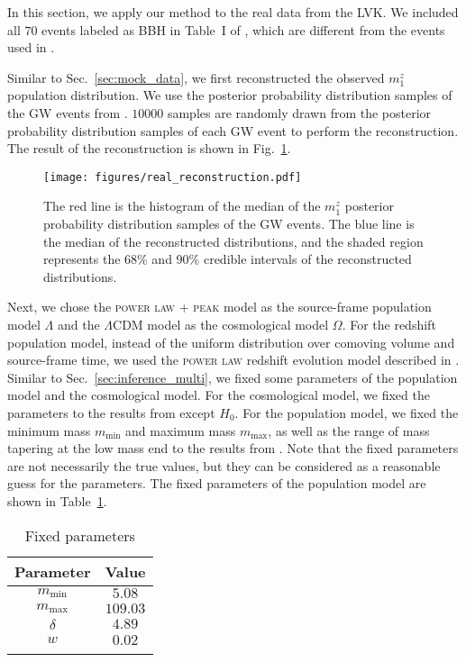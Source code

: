 \documentclass[sn-aps, pdflatex]{sn-jnl}
\begin{document}
In this section, we apply our method to the real data from the \ac{LVK}.
We included all $70$ events labeled as BBH in Table~I of \cite{KAGRA:2021duu}, which are different from the events used in \cite{LIGOScientific:2021aug}.

Similar to Sec.~\ref{sec:mock_data}, we first reconstructed the observed $m^z_1$ population distribution.
We use the posterior probability distribution samples of the \ac{GW} events from \cite{LIGOScientific:2019lzm, KAGRA:2023pio}.
$10000$ samples are randomly drawn from the posterior probability distribution samples of each \ac{GW} event to perform the reconstruction.
The result of the reconstruction is shown in Fig.~\ref{fig:real_reconstruction}.
\begin{figure}[htbp]
    \texttt{[image: figures/real\_reconstruction.pdf]}
    \caption{
        The red line is the histogram of the median of the $m^z_1$ posterior probability distribution samples of the \ac{GW} events.
        The blue line is the median of the reconstructed distributions, and the shaded region represents the 68\% and 90\% credible intervals of the reconstructed distributions.
    }
    \label{fig:real_reconstruction}
\end{figure}

Next, we chose the \textsc{power law + peak} model as the source-frame population model $\Lambda$ and the $\Lambda$CDM model as the cosmological model $\Omega$.
For the redshift population model, instead of the uniform distribution over comoving volume and source-frame time, we used the \textsc{power law} redshift evolution model described in \cite{KAGRA:2021duu}.
Similar to Sec.~\ref{sec:inference_multi}, we fixed some parameters of the population model and the cosmological model.
For the cosmological model, we fixed the parameters to the results from \cite{Planck:2018vyg} except $H_0$.
For the population model, we fixed the minimum mass $m_\mathrm{min}$ and maximum mass $m_\mathrm{max}$, as well as the range of mass tapering at the low mass end to the results from \cite{LIGOScientific:2021aug}.
Note that the fixed parameters are not necessarily the true values, but they can be considered as a reasonable guess for the parameters.
The fixed parameters of the population model are shown in Table~\ref{tab:fixed_parameters}.
\begin{table}[htbp]
    \caption{Fixed parameters}
    \begin{tabular}{cc}
        \toprule
        Parameter & Value \\
        \midrule
        $m_\mathrm{min}$ & $5.08$ \\
        $m_\mathrm{max}$ & $109.03$ \\
        $\delta$ & $4.89$ \\
        $w$ & $0.02$ \\
        \botrule
    \end{tabular}
    \label{tab:fixed_parameters}
\end{table}
\end{document}
